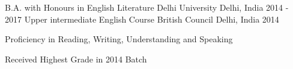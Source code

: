 

\begin{cventries}

  \cventry
    {B.A. with Honours in English Literature} %
    {Delhi University} %
    {Delhi, India} %
    {2014 - 2017} %
    {}
  \cventry
    {Upper intermediate English Course}
    {British Council}
    {Delhi, India}
    {2014}
    {
      \begin{cvitems}
        \item {Proficiency in Reading, Writing, Understanding and Speaking}
        \item {Received Highest Grade in 2014 Batch}
      \end{cvitems}
    }
\end{cventries}

